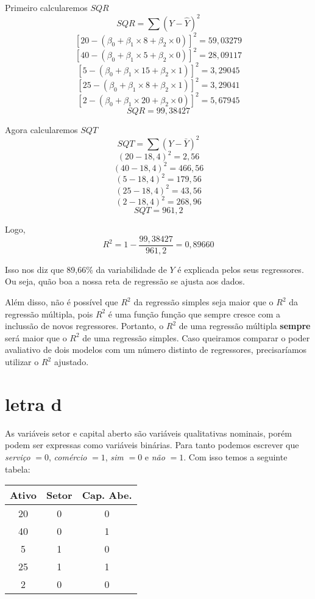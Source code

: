 Primeiro calcularemos \(SQR\)
\[SQR = \sum (Y - \widehat{Y})^{2}\]
\[ [ 20 - (\beta_{0} + \beta_{1} \times 8 + \beta_{2} \times 0)]^{2} =  59,03279 \]
\[ [ 40 - (\beta_{0} + \beta_{1} \times 5 + \beta_{2} \times 0)]^{2} =  28,09117 \]
\[ [ 5 - (\beta_{0} + \beta_{1} \times 15 + \beta_{2} \times 1)]^{2} =  3,29045 \]
\[ [ 25 - (\beta_{0} + \beta_{1} \times 8 + \beta_{2} \times 1)]^{2} =  3,29041 \]
\[ [ 2 - (\beta_{0} + \beta_{1} \times 20 + \beta_{2} \times 0)]^{2} =  5,67945 \]
\[ SQR = 99,38427\]

Agora calcularemos \(SQT\)
\[SQT = \sum (Y-\bar{Y})^{2}\]
\[ ( 20 - 18,4)^{2} = 2,56 \]
\[ ( 40 - 18,4)^{2} = 466,56 \]
\[ ( 5 - 18,4)^{2} = 179,56 \]
\[ ( 25 - 18,4)^{2} = 43,56 \]
\[ ( 2 - 18,4)^{2} = 268,96 \]
\[ SQT = 961,2\]

Logo,
\[ R^{2} = 1 - \frac{99,38427}{961,2} = 0,89660\]

Isso nos diz que 89,66\% da variabilidade de \(Y\) é explicada pelos seus regressores. Ou seja, quão boa a nossa reta de regressão se ajusta aos dados.

Além disso, não é possível que \(R^{2}\) da regressão simples seja maior que o \(R^{2}\) da regressão múltipla, pois \(R^{2}\) é uma função função que sempre cresce com a inclussão de novos regressores. Portanto, o \(R^{2}\) de uma regressão múltipla \textbf{sempre} será maior que o \(R^{2}\) de uma regressão simples. Caso queiramos comparar o poder avaliativo de dois modelos com um número distinto de regressores, precisaríamos utilizar o \(R^{2}\) ajustado.

\section{letra d}
As variáveis setor e capital aberto são variáveis qualitativas nominais, porém podem ser expressas como variáveis binárias. Para tanto podemos escrever que \textit{serviço} \(= 0\), \textit{comércio} \(= 1\), \textit{sim} \(= 0\) e \textit{não} \(= 1\). Com isso temos a seguinte tabela:
\begin{center}
    \begin{tabular}{|c|c|c|}
        \hline
         Ativo & Setor & Cap. Abe. \\ \hline
         20 & 0 & 0 \\ \hline
         40 & 0 & 1 \\ \hline
         5 & 1 & 0 \\ \hline
         25 & 1 & 1 \\ \hline
         2 & 0 & 0 \\ \hline
    \end{tabular}
\end{center}

